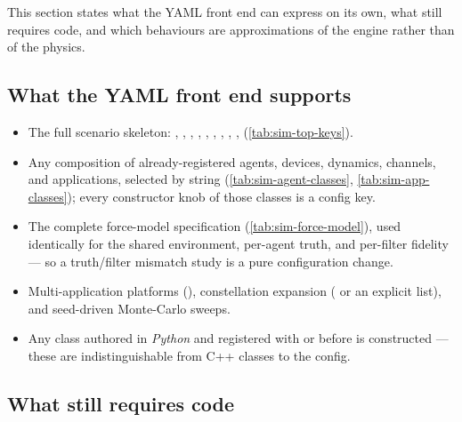 This section states what the YAML front end can express on its own, what still
requires code, and which behaviours are approximations of the engine rather than
of the physics.

\subsection{What the YAML front end supports}

\begin{itemize}[leftmargin=*]
  \item The full scenario skeleton: , , ,
    , , , ,
    , , 
    (\cref{tab:sim-top-keys}).
  \item Any composition of already-registered agents, devices, dynamics,
    channels, and applications, selected by string (\cref{tab:sim-agent-classes},
    \cref{tab:sim-app-classes}); every constructor knob of those classes is a
    config key.
  \item The complete force-model specification (\cref{tab:sim-force-model}),
    used identically for the shared environment, per-agent truth, and per-filter
    fidelity --- so a truth/filter mismatch study is a pure configuration change.
  \item Multi-application platforms (), constellation
    expansion ( or an explicit  list), and
    seed-driven Monte-Carlo sweeps.
  \item Any class authored in \emph{Python} and registered with
     or  before
     is constructed --- these are indistinguishable from C++
    classes to the config.
\end{itemize}

\subsection{What still requires code}

